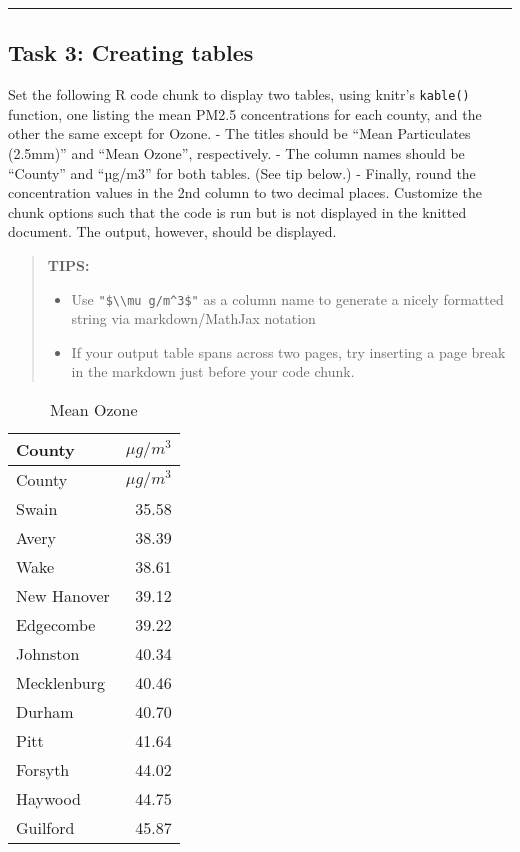 \documentclass[
]{article}
\begin{document}
\begin{center}\rule{0.5\linewidth}{0.5pt}\end{center}

\subsection{Task 3: Creating tables}\label{task-3-creating-tables}

Set the following R code chunk to display two tables, using knitr's
\texttt{kable()} function, one listing the mean PM2.5 concentrations for
each county, and the other the same except for Ozone. - The titles
should be ``Mean Particulates (2.5mm)'' and ``Mean Ozone'',
respectively. - The column names should be ``County'' and ``µg/m3'' for
both tables. (See tip below.) - Finally, round the concentration values
in the 2nd column to two decimal places. Customize the chunk options
such that the code is run but is not displayed in the knitted document.
The output, however, should be displayed.

\begin{quote}
\textbf{TIPS:}

\begin{itemize}
\item
  Use \texttt{"\$\textbackslash{}\textbackslash{}mu\ g/m\^{}3\$"} as a
  column name to generate a nicely formatted string via markdown/MathJax
  notation
\item
  If your output table spans across two pages, try inserting a page
  break in the markdown just before your code chunk.
\end{itemize}
\end{quote}

\begin{longtable}[]{@{}lr@{}}
\caption{Mean Ozone}\tabularnewline
\toprule\noalign{}
County & \(\mu g/m^3\) \\
\midrule\noalign{}
\endfirsthead
\toprule\noalign{}
County & \(\mu g/m^3\) \\
\midrule\noalign{}
\endhead
\bottomrule\noalign{}
\endlastfoot
Swain & 35.58 \\
Avery & 38.39 \\
Wake & 38.61 \\
New Hanover & 39.12 \\
Edgecombe & 39.22 \\
Johnston & 40.34 \\
Mecklenburg & 40.46 \\
Durham & 40.70 \\
Pitt & 41.64 \\
Forsyth & 44.02 \\
Haywood & 44.75 \\
Guilford & 45.87 \\
\end{longtable}
\end{document}
